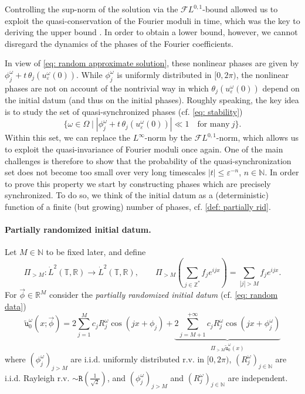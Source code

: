 \documentclass[a4paper,10pt,reqno]{article}
\theoremstyle{definition}
\theoremstyle{plain}
\theoremstyle{plain}
\theoremstyle{definition}
\theoremstyle{plain}
\theoremstyle{plain}
\theoremstyle{plain}
\theoremstyle{definition}
\theoremstyle{definition}
\def \N{\mathbb N}
\def \Z{\mathbb Z}
\def \R{\mathbb R}
\def \T{\mathbb{T}}
\def \FL{\mathcal{F}L}
\def \tu{\mathtt{u}}
\begin{document}
Controlling the sup-norm of the solution via the $\FL^{0,1}$-bound allowed us to exploit the quasi-conservation of the Fourier moduli in time, which was the key to deriving the upper bound . In order to obtain a lower bound, however, we cannot disregard the dynamics of the phases of the Fourier coefficients. 

In view of \eqref{eq: random approximate solution}, these nonlinear phases are given by 
$\phi_j^{\omega} + t\,\theta_j (u_{\varepsilon}^{\omega}(0))$. While $\phi_j^{\omega}$ is uniformly distributed in $[0,2\pi)$, the nonlinear phases are not on account of the nontrivial way in which $\theta_j (u_{\varepsilon}^{\omega}(0))$ depend on the initial datum (and thus on the initial phases). Roughly speaking, the key idea is to study the set of quasi-synchronized phases (cf. \eqref{eq: stability})
\begin{equation}\label{eq:quasi-synch intro}
\{ \omega\in\mathbb{\Omega} \mid |\phi_j^{\omega} + t\,\theta_j (u_{\varepsilon}^{\omega}(0))|\ll 1 \quad \mbox{for many}\ j\}.
\end{equation}
Within this set, we can replace the $L^{\infty}$-norm by the $\FL^{0,1}$-norm, which allows us to exploit the quasi-invariance of Fourier moduli once again. 
One of the main challenges is therefore to show that the probability of the quasi-synchronization set does not become too small 
over very long timescales $|t| \le \varepsilon^{-n}$, $n\in\N$. In order to prove this property we start by constructing phases which are precisely synchronized. 
To do so, we think of the initial datum as a (deterministic) function of a finite (but growing) number of phases, cf. \eqref{def: partially rid}.

\paragraph{Partially randomized initial datum.}
Let $M\in\N$ to be fixed later, and define
\begin{equation}
\Pi_{> M} : \dot{L}^2(\T,\R) \longrightarrow \dot{L}^2(\T,\R), \qquad \Pi_{> M} \left ( \sum_{j \in \Z^*} f_j e^{ijx} \right ) = \sum_{|j| > M} f_j e^{ijx}.
\end{equation}
For $\vec{\phi} \in \R^M$ consider the \textit{partially randomized initial datum} (cf. \eqref{eq: random data})
\begin{equation} \label{def: partially rid}
\widetilde{\tu}_0^{\omega}(x ; \vec{\phi} ) = 2 \sum_{j = 1}^M c_j R_j^{\omega} \cos(jx + \phi_j) + \underbrace{ 2 \sum_{j=M+1}^{+\infty} c_j R_j^{\omega} \cos(jx + \phi_j^{\omega}) }_{ \Pi_{>M} \widetilde{\tu}_0^{\omega}(x) }
\end{equation}
where $(\phi_j^{\omega})_{j > M}$ are i.i.d. uniformly distributed r.v. in $[0,2\pi)$, $(R_j^{\omega})_{j \in \N}$ are i.i.d. Rayleigh r.v. $\sim \mathtt{R} \left ( \frac{1}{\sqrt{2}} \right )$, and $(\phi_j^{\omega})_{j > M}$ and $(R_j^{\omega})_{j \in \N}$ are independent.
\end{document}
